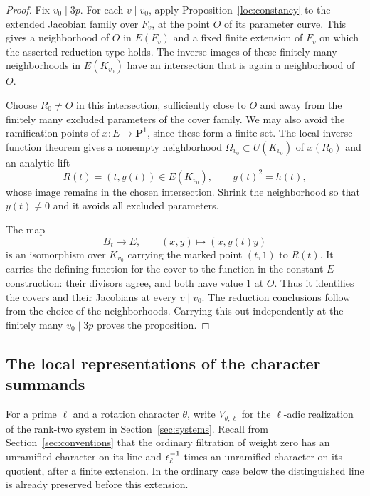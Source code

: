 \begin{proof}
Fix $v_0\mid3p$.  For each $v\mid v_0$, apply
Proposition~\ref{loc:constancy} to the extended Jacobian family over
$F_v$, at the point $O$ of its parameter curve.  This gives a
neighborhood of $O$ in $E(F_v)$ and a fixed finite extension of $F_v$
on which the asserted reduction type holds.  The inverse images of
these finitely many neighborhoods in $E(K_{v_0})$ have an intersection
that is again a neighborhood of $O$.

Choose $R_0\ne O$ in this intersection, sufficiently close to $O$ and
away from the finitely many excluded parameters of the cover family.
We may also avoid the ramification points of
$x:E\to\mathbf P^1$, since these form a finite set.  The local inverse
function theorem gives a nonempty neighborhood
$\Omega_{v_0}\subset U(K_{v_0})$ of $x(R_0)$ and an analytic lift
\[
 R(t)=(t,y(t))\in E(K_{v_0}),\qquad y(t)^2=h(t),
\]
whose image remains in the chosen intersection.  Shrink the neighborhood
so that $y(t)\ne0$ and it avoids all excluded parameters.

The map
\[
 B_t\longrightarrow E,\qquad (x,y)\longmapsto(x,y(t)y)
\]
is an isomorphism over $K_{v_0}$ carrying the marked point $(t,1)$ to
$R(t)$.  It carries the defining function for the cover to the function
in the constant-$E$ construction: their divisors agree, and both have
value $1$ at $O$.  Thus it identifies the covers and their Jacobians at
every $v\mid v_0$.  The reduction conclusions follow from the choice of
the neighborhoods.  Carrying this out independently at the finitely
many $v_0\mid3p$ proves the proposition.
\end{proof}

\subsection{The local representations of the character summands}

For a prime $\ell$ and a rotation character $\theta$, write
$V_{\theta,\ell}$ for the $\ell$-adic realization of the rank-two system
in Section~\ref{sec:systems}.  Recall from Section~\ref{sec:conventions} that the ordinary
filtration of weight zero has an unramified character on its line and
$\epsilon_\ell^{-1}$ times an unramified character on its quotient, after
a finite extension.  In the ordinary case below the distinguished
line is already preserved before this extension.

